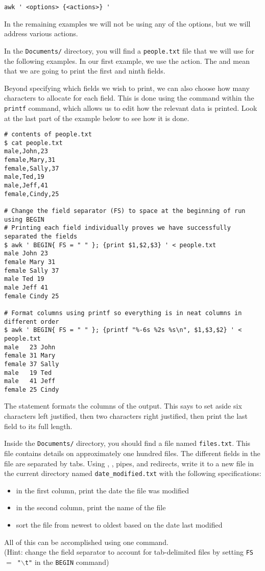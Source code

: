 \begin{lstlisting}
awk ' <options> {<actions>} '
\end{lstlisting}

In the remaining examples we will not be using any of the options, but we will address various actions.

In the \texttt{Documents/} directory, you will find a \texttt{people.txt} file that we will use for the following examples.
In our first example, we use the  action.
The  and  mean that we are going to print the first and ninth fields.

Beyond specifying which fields we wish to print, we can also choose how many characters to allocate for each field.
This is done using the \li{\%} command within the \texttt{printf} command, which allows us to edit how the relevant data is printed.
Look at the last part of the example below to see how it is done.

\begin{lstlisting}
# contents of people.txt
$ cat people.txt
male,John,23
female,Mary,31
female,Sally,37
male,Ted,19
male,Jeff,41
female,Cindy,25

# Change the field separator (FS) to space at the beginning of run using BEGIN 
# Printing each field individually proves we have successfully separated the fields
$ awk ' BEGIN{ FS = " " }; {print $1,$2,$3} ' < people.txt
male John 23
female Mary 31
female Sally 37
male Ted 19
male Jeff 41
female Cindy 25

# Format columns using printf so everything is in neat columns in different order
$ awk ' BEGIN{ FS = " " }; {printf "%-6s %2s %s\n", $1,$3,$2} ' < people.txt
male   23 John
female 31 Mary
female 37 Sally
male   19 Ted
male   41 Jeff
female 25 Cindy
\end{lstlisting}

The statement  formats the columns of the output.
This says to set aside six characters left justified, then two characters right justified, then print the last field to its full length.

\begin{problem}
Inside the \texttt{Documents/} directory, you should find a file named \texttt{files.txt}.
This file contains details on approximately one hundred files.
The different fields in the file are separated by tabs.
Using , , pipes, and redirects, write it to a new file in the current directory named \texttt{date\_modified.txt} with the following specifications:
\begin{itemize}
\item in the first column, print the date the file was modified
\item in the second column, print the name of the file
\item sort the file from newest to oldest based on the date last modified
\end{itemize}
All of this can be accomplished using one command.
\\(Hint: change the field separator to account for tab-delimited files by setting \texttt{FS $=$ "$\backslash$t"} in the \texttt{BEGIN} command)
\end{problem}

